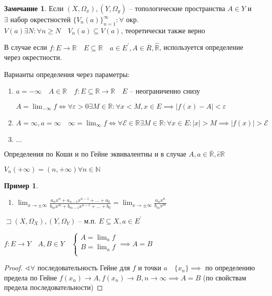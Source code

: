 \documentclass{book}
\newcommand\N{\ensuremath{\mathbb{N}}}
\newcommand\R{\ensuremath{\mathbb{R}}}
\newcommand{\p}[1]{#1^{\prime}}
\newcommand{\ov}[1]{\overline{#1}}
\theoremstyle{definition}
\newtheorem*{note}{Замечание}
\newtheorem*{example}{Пример}
\begin{document}
\begin{note}
    Если  $(X, \Omega_x), (Y, \Omega_y)$ -- топологические пространства  $A\in Y$ и $\exists $ набор окрестностей $\{V_n(a)\}_{n=1}^{\infty }:\forall $ окр. $V(a) \exists N: \forall n\geqslant N\quad V_n(a)\subseteq V(a)$, теоретически также верно
\end{note}

В случае если $f:E\to \R\quad E\subseteq \R\quad a\in \p E, A\in \ov R, \widehat{\R}$, используется определение через окрестности.

Варианты определения через параметры:
\begin{enumerate}
    \item $a = -\infty \quad A\in \R\quad f:E\subseteq \R\to \R\quad E$ -- неограниченно снизу

        $A = \lim_{-\infty }f \iff \forall \varepsilon>0\exists M\in \R:\forall x<M, x\in E \implies \left| f(x)-A \right| <\varepsilon$
    \item $A = \infty , a = \infty \quad \infty  = \lim_{\infty } f \iff \forall \mathscr{E}\in \R\exists M\in \R: \forall x\in E: \left| x \right| >M \implies \left| f(x) \right| >\mathscr{E}$
    \item $\ldots$
\end{enumerate}

\begin{problem}
Определения по Коши и по Гейне эквивалентны и в случае $A, a\in \ov {\R}, \widehat{e} {\R}$

$V_n(+\infty ) = (n, +\infty ) \forall n\in \N $
\end{problem}

\begin{example}
    \begin{enumerate}
        \item $\lim_{x \to \pm\infty } \frac{a_nx^n + a_{n-1}x^{n-1} + \ldots + a_0}{b_mx^m + b_{m-1}x^{n-1} + \ldots + b_0} = \lim_{x \to \pm\infty } \frac{a_n x^n}{b_mx^m}$
    \end{enumerate}
\end{example}

\begin{theorem}

    $\sqsupset (X, \Omega_X), (Y, \Omega_Y)$ -- м.п. $E\subseteq X, a\in \p E$

    $f:E\to Y\quad A, B\in Y\quad \begin{cases}
        A = \lim_af\\
        B = \lim_af\\
    \end{cases} \implies A=B$
\end{theorem}
\begin{proof}
    $\sphericalangle \forall $ последовательность Гейне для  $f$ и точки  $a\quad \{x_{n} \} \implies $ по определению предела по Гейне $f(x_{n} ) \to A, f(x_{n} )\to B, n\to \infty \implies A=B$ (по свойствам предела последовательности) 
\end{proof}
\end{document}
